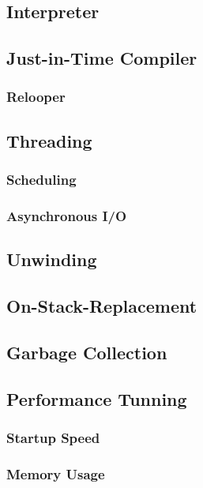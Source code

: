 \documentclass{acm_proc_article-sp}
\begin{document}
\subsection{Interpreter}

\subsection{Just-in-Time Compiler}

\subsubsection{Relooper}

\subsection{Threading}

\subsubsection{Scheduling}

\subsubsection{Asynchronous I/O}

\subsection{Unwinding}

\subsection{On-Stack-Replacement}

\subsection{Garbage Collection}

\subsection{Performance Tunning}

\subsubsection{Startup Speed}

\subsubsection{Memory Usage}
\end{document}
